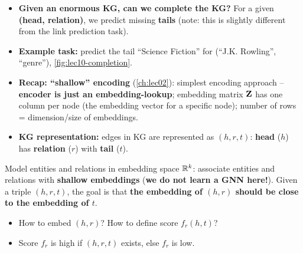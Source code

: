\begin{itemize}
  \item \textbf{Given an enormous KG, can we complete the KG?} For a given
    \textbf{(head, relation)}, we predict missing \textbf{tails} (note: this is
    slightly different from the link prediction task).
  \item \textbf{Example task:} predict the tail ``Science Fiction'' for
    (``J.K. Rowling'', ``genre''), \cref{fig:lec10-completion}.
  \item \textbf{Recap: ``shallow'' encoding} (\cref{ch:lec02}): simplest encoding
    approach -- \textbf{encoder is just an embedding-lookup}; embedding matrix
    $\mathbf{Z}$ has one column per node (the embedding vector for a specific node);
    number of rows = dimension/size of embeddings.
  \item \textbf{KG representation:} edges in KG are represented as
     $(h,r,t)$: \textbf{head} ($h$) has \textbf{relation} ($r$) with
    \textbf{tail} ($t$).
\end{itemize}

\begin{keyidea}
  Model entities and relations in embedding space $\mathbb{R}^k$: associate entities and
  relations with \textbf{shallow embeddings} (\textbf{we do not learn a GNN
  here!}). Given a triple $(h,r,t)$, the goal is that \textbf{the embedding of
  $(h,r)$ should be close to the embedding of $t$}.
  \begin{itemize}
    \item How to embed $(h,r)$? How to define score $f_r(h,t)$?
    \item Score $f_r$ is high if $(h,r,t)$ exists, else $f_r$ is low.
  \end{itemize}
\end{keyidea}

